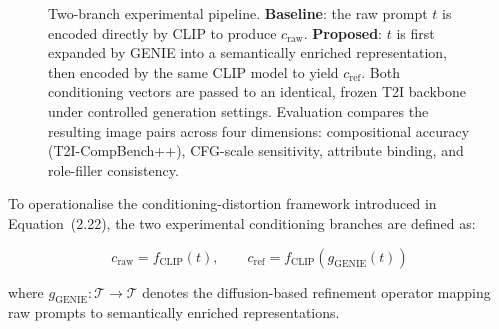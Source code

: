 \documentclass[a4paper,twoside,12pt]{report}
\begin{document}
\begin{figure}[ht]

\caption{
Two-branch experimental pipeline.
\textbf{Baseline}: the raw prompt \(t\) is encoded directly by CLIP to produce
\(c_{\mathrm{raw}}\).
\textbf{Proposed}: \(t\) is first expanded by GENIE into a semantically enriched representation, then encoded by the same CLIP model to yield \(c_{\mathrm{ref}}\).
Both conditioning vectors are passed to an identical, frozen T2I backbone under controlled generation settings.
Evaluation compares the resulting image pairs across four dimensions: compositional accuracy (T2I-CompBench++), CFG-scale sensitivity, attribute binding, and role-filler consistency.
}

\label{fig:pipeline}

\end{figure}


\noindent
To operationalise the conditioning-distortion framework introduced in Equation~(2.22), the two experimental conditioning branches are defined as:

\begin{equation}
c_{\mathrm{raw}}
=
f_{\mathrm{CLIP}}(t),
\qquad
c_{\mathrm{ref}}
=
f_{\mathrm{CLIP}}\!\left(g_{\mathrm{GENIE}}(t)\right)
\label{eq:conditioning_pair}
\end{equation}

\noindent
where \(g_{\mathrm{GENIE}} : \mathcal{T} \rightarrow \mathcal{T}\) denotes the diffusion-based refinement operator mapping raw prompts to semantically enriched representations.
\end{document}
